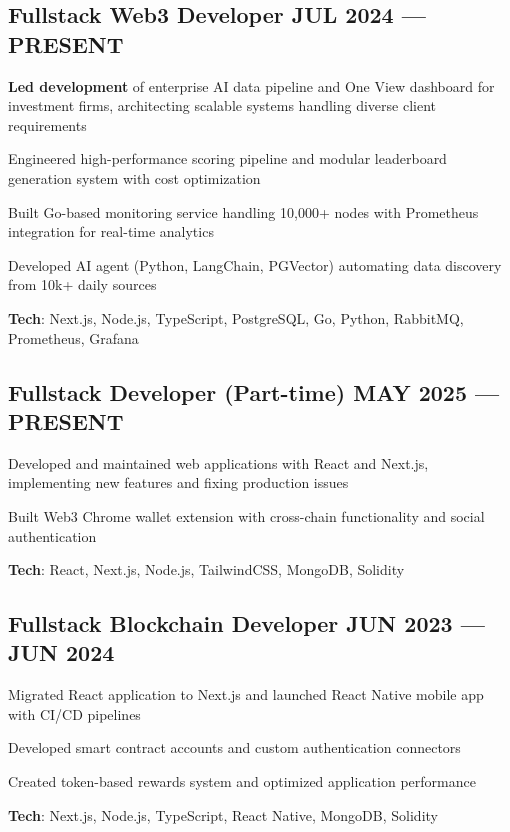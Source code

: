 \documentclass[letter,10pt]{article}
\begin{document}
\subsection{{Fullstack Web3 Developer \hfill JUL 2024 --- PRESENT}}
\begin{zitemize}
  \item \textbf{Led development} of enterprise AI data pipeline and One View dashboard for investment firms, architecting scalable systems handling diverse client requirements
  \item Engineered high-performance scoring pipeline and modular leaderboard generation system with cost optimization
  \item Built Go-based monitoring service handling 10,000+ nodes with Prometheus integration for real-time analytics
  \item Developed AI agent (Python, LangChain, PGVector) automating data discovery from 10k+ daily sources
  \item \textbf{Tech}: Next.js, Node.js, TypeScript, PostgreSQL, Go, Python, RabbitMQ, Prometheus, Grafana
\end{zitemize}


\subsection{{Fullstack Developer (Part-time) \hfill MAY 2025 --- PRESENT}}
\begin{zitemize}
  \item Developed and maintained web applications with React and Next.js, implementing new features and fixing production issues
  \item Built Web3 Chrome wallet extension with cross-chain functionality and social authentication
  \item \textbf{Tech}: React, Next.js, Node.js, TailwindCSS, MongoDB, Solidity
\end{zitemize}



\subsection{{ Fullstack Blockchain Developer \hfill JUN 2023 --- JUN 2024}}
\begin{zitemize}
  \item Migrated React application to Next.js and launched React Native mobile app with CI/CD pipelines
  \item Developed smart contract accounts and custom authentication connectors
  \item Created token-based rewards system and optimized application performance
  \item \textbf{Tech}: Next.js, Node.js, TypeScript, React Native, MongoDB, Solidity
\end{zitemize}
\end{document}
